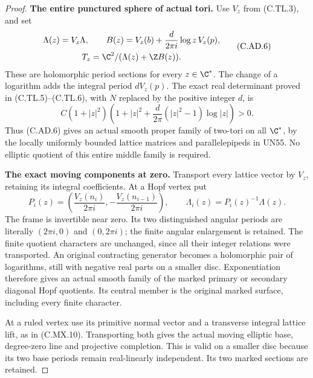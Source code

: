 \begin{proof}
\par\medskip\noindent\textbf{The entire punctured sphere of actual tori.}
Use $V_z$ from (C.TL.3), and set
\[
 \begin{gathered}
 \Lambda(z)=V_z\Lambda,\qquad
 B(z)=V_z(b)+\frac{d}{2\pi i}\log z\,V_z(p),\\
                   T_z=\C^2/(\Lambda(z)+\Z B(z)).
 \end{gathered}                                        \tag{C.AD.6}
\]
These are holomorphic period sections for every $z\in\C^*$.
The change of a logarithm adds the integral period $dV_z(p)$.
The exact real determinant proved in (C.TL.5)--(C.TL.6), with
$N$ replaced by the positive integer $d$, is
\[
 C(1+|z|^2)\left(1+|z|^2+
          \frac{d}{2\pi}(|z|^2-1)\log|z|\right)>0.
                                                        \tag{C.AD.7}
\]
Thus (C.AD.6) gives an actual smooth proper family of two-tori
on all $\C^*$, by the locally uniformly bounded lattice
matrices and parallelepipeds in UN55. No elliptic quotient
of this entire middle family is required.

\par\medskip\noindent\textbf{The exact moving components at zero.}
Transport every lattice vector by $V_z$, retaining its integral
coefficients. At a Hopf vertex put
\[
 P_i(z)=\left(\frac{V_z(n_i)}{2\pi i},
                       -\frac{V_z(n_{i-1})}{2\pi i}\right),
 \qquad \Lambda_i(z)=P_i(z)^{-1}\Lambda(z).
                                                        \tag{C.AD.8}
\]
The frame is invertible near zero. Its two distinguished
angular periods are literally $(2\pi i,0)$ and $(0,2\pi i)$;
the finite angular enlargement is retained. The finite quotient characters
are unchanged, since all their integer relations were
transported. An original contracting generator becomes a
holomorphic pair of logarithms, still with negative real
parts on a smaller disc. Exponentiation therefore gives an
actual smooth family of the marked primary or secondary
diagonal Hopf quotients. Its central member is the original
marked surface, including every finite character.

At a ruled vertex use its primitive normal vector and a
transverse integral lattice lift, as in (C.MX.10). Transporting
both gives the actual moving elliptic base, degree-zero line
and projective completion. This is valid on a smaller disc
because its two base periods remain real-linearly independent.
Its two marked sections are retained.


\end{proof}
